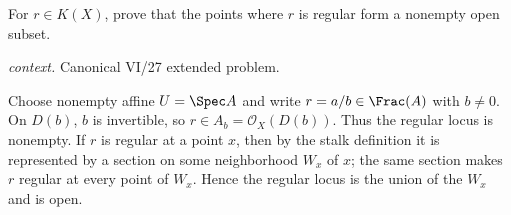 \begin{problem}\label{prob:vi27-p09}
For \(r\in K(X)\), prove that the points where \(r\) is regular form a nonempty open subset.
\par\smallskip\noindent\textit{context.} Canonical VI/27 extended problem.
\end{problem}

\ifdefined\FullProblemDossiers
\begin{solution}
Choose nonempty affine \(U=\Spec A\) and write \(r=a/b\in\Frac(A)\) with \(b\ne0\). On \(D(b)\), \(b\) is
invertible, so \(r\in A_b=\mathcal O_X(D(b))\). Thus the regular locus is nonempty. If \(r\) is regular at a
point \(x\), then by the stalk definition it is represented by a section on some neighborhood \(W_x\) of \(x\);
the same section makes \(r\) regular at every point of \(W_x\). Hence the regular locus is the union of the
\(W_x\) and is open.
\end{solution}
\fi
